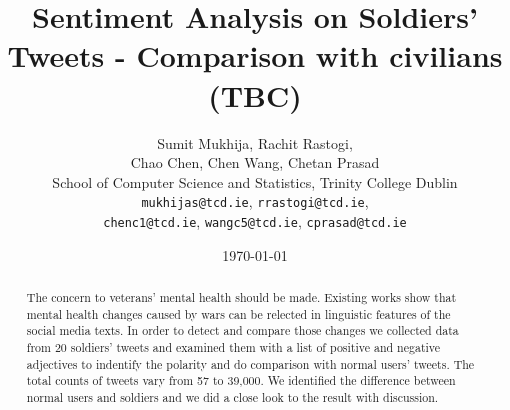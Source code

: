 \documentclass[english,a4paper,11pt]{article}
\title{Sentiment Analysis on Soldiers' Tweets - Comparison with civilians (TBC)}
\date{\today}
\author{
  Sumit Mukhija, Rachit Rastogi,\\
  Chao Chen, Chen Wang, Chetan Prasad\\
  School of Computer Science and Statistics, Trinity College Dublin\\
  \texttt{mukhijas@tcd.ie}, \texttt{rrastogi@tcd.ie},\\
  \texttt{chenc1@tcd.ie}, \texttt{wangc5@tcd.ie}, \texttt{cprasad@tcd.ie}
}
\begin{document}
\maketitle
\thispagestyle{empty}
\pagestyle{empty}

\begin{abstract}
The concern to veterans' mental health should be made. Existing works show that
mental health changes caused by wars can be relected in linguistic features of
the social media texts. In order to detect and compare those changes we collected
data from 20 soldiers' tweets and examined them with a list of positive and negative
adjectives to indentify the polarity and do comparison with normal users'
tweets. The total counts of tweets vary from 57 to 39,000. We identified the
difference between normal users and soldiers and we did a close look to the
result with discussion.
\end{abstract}









\printbibliography
\end{document}
